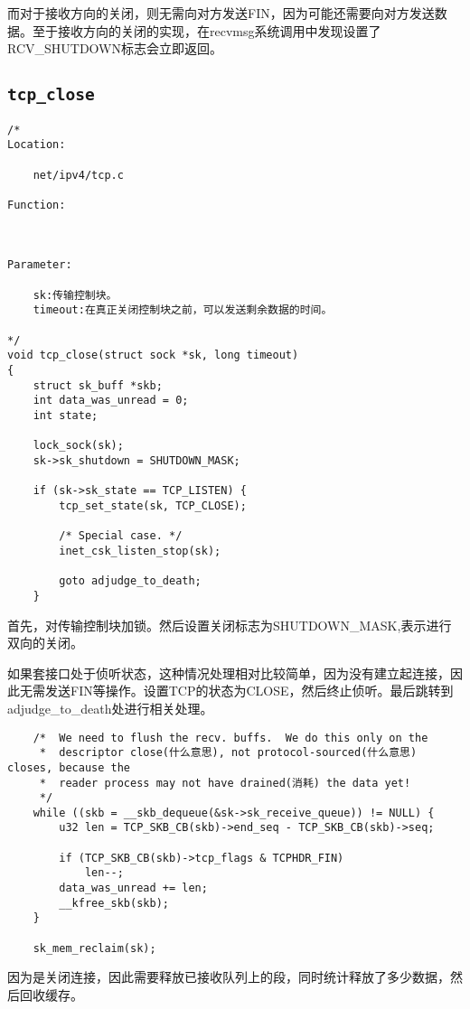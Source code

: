         而对于接收方向的关闭，则无需向对方发送FIN，因为可能还需要向对方发送数据。至于接收方向的关闭的实现，在recvmsg系统调用中发现设置了RCV\_SHUTDOWN标志会立即返回。

    \subsection{\texttt{tcp_close}}
\begin{verbatim}
/*
Location:

    net/ipv4/tcp.c

Function:

        

Parameter:

    sk:传输控制块。
    timeout:在真正关闭控制块之前，可以发送剩余数据的时间。
    
*/
void tcp_close(struct sock *sk, long timeout)
{
    struct sk_buff *skb;
    int data_was_unread = 0;
    int state;

    lock_sock(sk);
    sk->sk_shutdown = SHUTDOWN_MASK;

    if (sk->sk_state == TCP_LISTEN) {
        tcp_set_state(sk, TCP_CLOSE);

        /* Special case. */
        inet_csk_listen_stop(sk);

        goto adjudge_to_death;
    }
\end{verbatim}

        首先，对传输控制块加锁。然后设置关闭标志为SHUTDOWN\_MASK,表示进行双向的关闭。

        如果套接口处于侦听状态，这种情况处理相对比较简单，因为没有建立起连接，因此无需发送FIN等操作。设置TCP的状态为CLOSE，然后终止侦听。最后跳转到adjudge\_to\_death处进行相关处理。

\begin{verbatim}
    /*  We need to flush the recv. buffs.  We do this only on the
     *  descriptor close(什么意思), not protocol-sourced(什么意思) closes, because the
     *  reader process may not have drained(消耗) the data yet!
     */
    while ((skb = __skb_dequeue(&sk->sk_receive_queue)) != NULL) {
        u32 len = TCP_SKB_CB(skb)->end_seq - TCP_SKB_CB(skb)->seq;

        if (TCP_SKB_CB(skb)->tcp_flags & TCPHDR_FIN)
            len--;
        data_was_unread += len;
        __kfree_skb(skb);
    }

    sk_mem_reclaim(sk);
\end{verbatim}

        因为是关闭连接，因此需要释放已接收队列上的段，同时统计释放了多少数据，然后回收缓存。

